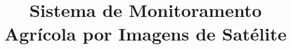 \documentclass[alpha-refs,english,brazilian]{CC-EC_TF-TC}
\title{Sistema de Monitoramento Agrícola por Imagens de Satélite}
\begin{document}
\begin{frontmatter}
\maketitle
\thispagestyle{empty}

\end{frontmatter}
\clearpage











\end{document}
